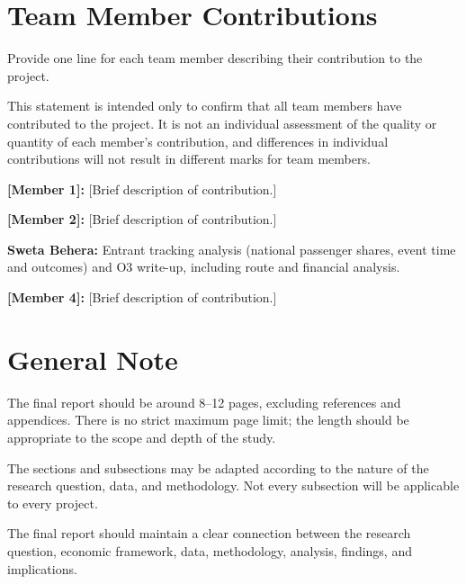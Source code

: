 \documentclass[12pt,a4paper]{article}
\newenvironment{o3box}{\ifthenelse{\boolean{o3highlight}}{\begingroup\color{o3sky}}{}}{\ifthenelse{\boolean{o3highlight}}{\endgroup}{}}
\newcommand{\templatebullet}[1]{\par\noindent\textbullet\hspace{5.88pt}#1\par}
\begin{document}
\section*{Team Member Contributions}
Provide one line for each team member describing their contribution to the project.

This statement is intended only to confirm that all team members have contributed to the project. It is not an individual assessment of the quality or quantity of each member's contribution, and differences in individual contributions will not result in different marks for team members.
\templatebullet{\textbf{[Member 1]:} [Brief description of contribution.]}
\templatebullet{\textbf{[Member 2]:} [Brief description of contribution.]}
\begin{o3box}
\templatebullet{\textbf{Sweta Behera:} Entrant tracking analysis (national passenger shares, event time and outcomes) and O3 write-up, including route and financial analysis.}
\end{o3box}
\templatebullet{\textbf{[Member 4]:} [Brief description of contribution.]}


\newpage
\section*{General Note}
The final report should be around 8--12 pages, excluding references and appendices. There is no strict maximum page limit; the length should be appropriate to the scope and depth of the study.

The sections and subsections may be adapted according to the nature of the research question, data, and methodology. Not every subsection will be applicable to every project.

The final report should maintain a clear connection between the research question, economic framework, data, methodology, analysis, findings, and implications.
\end{document}

